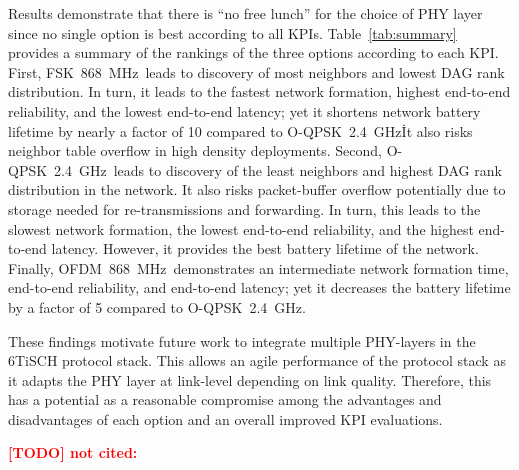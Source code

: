 \documentclass[sensors,article,submit,moreauthors,pdftex]{Definitions/mdpi}
\newcommand{\fsk}           {FSK~868~MHz}
\newcommand{\oqpsk}         {O-QPSK~2.4~GHz}
\newcommand{\ofdm}          {OFDM~868~MHz}
\newcommand{\todo}[1]       {\textbf{\textcolor{red}{[TODO] #1}}}
\begin{document}

Results demonstrate that there is ``no free lunch'' for the choice of PHY layer since no single option is best according to all KPIs.
Table~\ref{tab:summary} provides a summary of the rankings of the three options according to each KPI.
First, \fsk\ leads to discovery of most neighbors and lowest DAG rank distribution.
In turn, it leads to the fastest network formation, highest end-to-end reliability, and the lowest end-to-end latency; yet it shortens network battery lifetime by nearly a factor of 10 compared to \oqpsk\. 
It also risks neighbor table overflow in high density deployments.
Second, \oqpsk\ leads to discovery of the least neighbors and highest DAG rank distribution in the network.
It also risks packet-buffer overflow potentially due to storage needed for re-transmissions and forwarding.
In turn, this leads to the slowest network formation, the lowest end-to-end reliability, and the highest end-to-end latency.
However, it provides the best battery lifetime of the network. 
Finally, \ofdm\ demonstrates an intermediate network formation time, end-to-end reliability, and end-to-end latency; yet  it decreases the battery lifetime by a factor of 5 compared to \oqpsk.


These findings motivate future work to integrate multiple PHY-layers in the 6TiSCH protocol stack.
This allows an agile performance of the protocol stack as it adapts the PHY layer at link-level depending on link quality.
Therefore, this has a potential as a reasonable compromise among the advantages and disadvantages of each option and an overall improved KPI evaluations. 


\todo{not cited: \cite{adelantado17understanding}}


\end{document}
